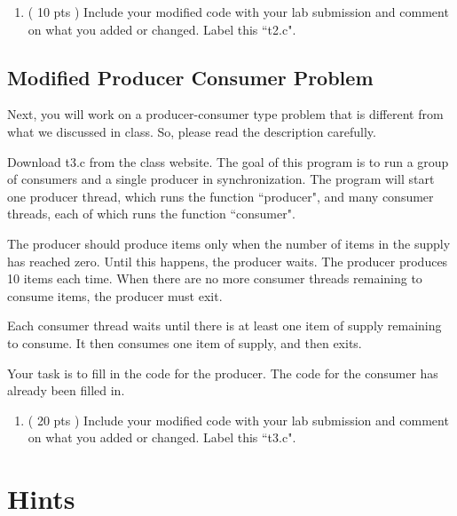 \documentclass[letterpaper,10pt]{article}
\begin{document}
\begin{enumerate}
\item ( 10 pts ) Include your modified code with your lab submission and comment
on what you added or changed. Label this ``t2.c".
\end{enumerate}


\subsection{Modified Producer Consumer Problem}

Next, you will work on a producer-consumer type problem that is different
from what we discussed in class. So, please read the description carefully.

Download t3.c from the class website. The goal of this program is to run a
group of consumers and a single producer in synchronization. The program will
start one producer thread, which runs the function ``producer", and many
consumer threads, each of which runs the function ``consumer".

The producer should produce items only when the number of items in the supply has
reached zero. Until this happens, the producer waits. The producer produces 10
items each time. When there are no more consumer threads remaining to consume
items, the producer must exit.

Each consumer thread waits until there is at least one item of supply remaining
to consume. It then consumes one item of supply, and then exits.

Your task is to fill in the code for the producer. The code for the consumer
has already been filled in.

\begin{enumerate}
\item ( 20 pts ) Include your modified code with your lab submission and
comment on what you added or changed. Label this ``t3.c".
\end{enumerate}


\section{Hints}
\label{hints}
\end{document}
